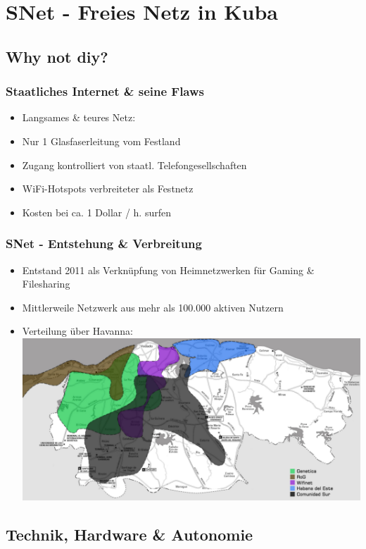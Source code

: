 \section{SNet - Freies Netz in Kuba}
\subsection{Why not diy?}

\begin{frame}
\frametitle{Staatliches Internet \& seine Flaws}
	\begin{itemize}
		\item Langsames \& teures Netz:
		\item Nur 1 Glasfaserleitung vom Festland
		\item Zugang kontrolliert von staatl. Telefongesellschaften
		\item WiFi-Hotspots verbreiteter als Festnetz
		\item Kosten bei ca. 1 Dollar / h. surfen
	\end{itemize}
\end{frame}



\begin{frame}
\frametitle{SNet - Entstehung \& Verbreitung}
	\begin{itemize}
		\item Entstand 2011 als Verknüpfung von Heimnetzwerken für Gaming \& Filesharing
		\item Mittlerweile Netzwerk aus mehr als 100.000 aktiven Nutzern
		\item Verteilung über Havanna:
			\includegraphics[width=\textwidth]{images/havanna_net.jpg}
	\end{itemize}
	
\end{frame}

\subsection{Technik, Hardware \& Autonomie}

